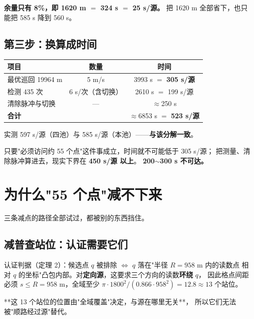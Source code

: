 \textbf{余量只有 8\%，即 1620 m $=$ 324 s $=$ 25 s/源。}
把 1620 m 全部省下，也只能把 585 s 降到 560 s。

\subsection{第三步：换算成时间}

\begin{center}
\begin{tabular}{lcc}
\toprule
项目 & 数量 & 时间 \\ \midrule
最优巡回 19964 m & 5 m/s & 3993 s $=$ \textbf{305 s/源} \\
检测 435 次 & 6 s/次（含切换） & 2610 s $=$ 199 s/源 \\
清除脉冲与切换 & --- & $\approx$250 s \\
\midrule
\textbf{合计} & & $\approx$6853 s $=$ \textbf{523 s/源} \\
\bottomrule
\end{tabular}
\end{center}

实测 597 s/源（四池）与 585 s/源（本池）——\textbf{与该分解一致}。

\begin{warnbox}[title=结论]
只要"必须访问约 55 个点"这件事成立，时间就不可能低于 305 s/源；
把测量、清除脉冲算进去，现实下界在 \textbf{450 s/源 以上}。
\textbf{200$\sim$300 s 不可达。}
\end{warnbox}

\section{为什么"55 个点"减不下来}

三条减点的路径全部试过，都被别的东西挡住。

\subsection{减普查站位：认证需要它们}

认证判据（定理 2）：候选点 $q$ 被排除 $\iff$ $q$ 落在"半径 $R=958$ m 内的读数点
相对 $q$ 的坐标"凸包内部。对\textbf{定向源}，这要求三个方向的读数\textbf{环绕} $q$，
因此格点间距必须 $s\le R=958$ m，全域至少
$\pi\cdot1800^2/(0.866\cdot958^2)=12.8\approx13$ 个站位。

**这 13 个站位的位置由"全域覆盖"决定，与源在哪里无关**，
所以它们无法被"顺路经过源"替代。

